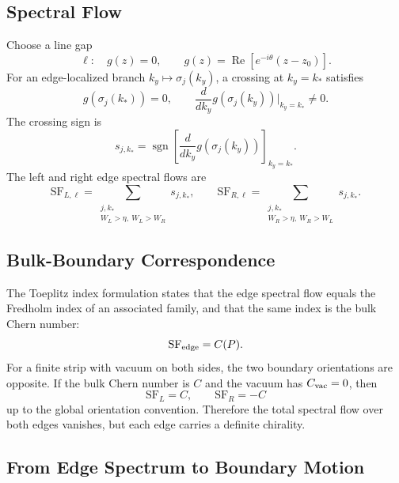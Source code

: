 \documentclass[11pt]{article}
\numberwithin{equation}{section}
\begin{document}
\subsection{Spectral Flow}

Choose a line gap
\begin{equation}
  \ell:\quad g(z)=0,
  \qquad
  g(z)=\operatorname{Re}[e^{-i\theta}(z-z_0)] .
\end{equation}
For an edge-localized branch $k_y\mapsto\sigma_j(k_y)$, a crossing at
$k_y=k_\ast$ satisfies
\begin{equation}
  g(\sigma_j(k_\ast))=0,\qquad
  \frac{d}{dk_y}g(\sigma_j(k_y))\bigg|_{k_y=k_\ast}\ne0.
\end{equation}
The crossing sign is
\begin{equation}
  s_{j,k_\ast}=
  \operatorname{sgn}
  \left[
  \frac{d}{dk_y}g(\sigma_j(k_y))
  \right]_{k_y=k_\ast}.
\end{equation}
The left and right edge spectral flows are
\begin{equation}
  \mathrm{SF}_{L,\ell}=
  \sum_{\substack{j,k_\ast\\ W_L>\eta,\ W_L>W_R}}s_{j,k_\ast},
  \qquad
  \mathrm{SF}_{R,\ell}=
  \sum_{\substack{j,k_\ast\\ W_R>\eta,\ W_R>W_L}}s_{j,k_\ast}.
\end{equation}

\subsection{Bulk-Boundary Correspondence}

The Toeplitz index formulation states that the edge spectral flow equals
the Fredholm index of an associated family, and that the same index is the
bulk Chern number:
\begin{equation}
  \mathrm{SF}_{\rm edge}=C(P).
  \label{eq:bulk_boundary}
\end{equation}
For a finite strip with vacuum on both sides, the two boundary
orientations are opposite. If the bulk Chern number is $C$ and the vacuum
has $C_{\rm vac}=0$, then
\begin{equation}
  \mathrm{SF}_L=C,\qquad
  \mathrm{SF}_R=-C
\end{equation}
up to the global orientation convention. Therefore the total spectral
flow over both edges vanishes, but each edge carries a definite chirality.

\subsection{From Edge Spectrum to Boundary Motion}
\end{document}
